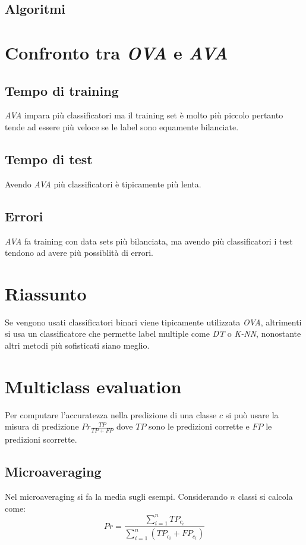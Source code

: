 	\subsection{Algoritmi}
	
	

\section{Confronto tra \emph{OVA} e \emph{AVA}}

	\subsection{Tempo di training}
	\emph{AVA} impara pi\`u classificatori ma il training set \`e molto pi\`u piccolo pertanto tende ad essere pi\`u veloce se le label sono equamente bilanciate.

	\subsection{Tempo di test}
	Avendo \emph{AVA} pi\`u classificatori \`e tipicamente pi\`u lenta.

	\subsection{Errori}
	\emph{AVA} fa training con data sets pi\`u bilanciata, ma avendo pi\`u classificatori i test tendono ad avere pi\`u possiblit\`a di errori.

\section{Riassunto}
Se vengono usati classificatori binari viene tipicamente utilizzata  \emph{OVA}, altrimenti si usa un classificatore che permette label multiple come \emph{DT} o \emph{K-NN}, nonostante altri metodi pi\`u sofisticati siano meglio.

\section{Multiclass evaluation}
Per computare l'accuratezza nella predizione di una classe $c$ si pu\`o usare la misura di predizione $Pr \frac{TP}{TP+FP}$ dove $TP$ sono le predizioni corrette e $FP$ le predizioni scorrette.

	\subsection{Microaveraging}
	Nel microaveraging si fa la media sugli esempi.
	Considerando $n$ classi si calcola come:
	$$Pr=\dfrac{\sum\limits_{i=1}^nTP_{c_i}}{\sum\limits_{i=1}^n(TP_{c_i}+FP_{c_i})}$$

